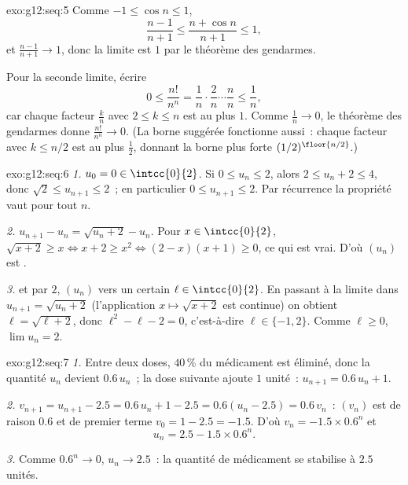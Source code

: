 \begin{solution}{exo:g12:seq:5}
Comme $-1 \leq \cos n \leq 1$,
\[
\frac{n-1}{n+1} \leq \frac{n + \cos n}{n+1} \leq 1,
\]
et $\frac{n-1}{n+1} \to 1$, donc la limite est $1$ par le théorème des
gendarmes.

Pour la seconde limite, écrire
\[
0 \leq \frac{n!}{n^n}
= \frac{1}{n}\cdot\frac{2}{n}\cdots\frac{n}{n}
\leq \frac{1}{n},
\]
car chaque facteur $\frac{k}{n}$ avec $2 \leq k \leq n$ est au plus $1$.
Comme $\frac1n \to 0$, le théorème des gendarmes donne
$\frac{n!}{n^n} \to 0$. (La borne  suggérée fonctionne aussi~:
chaque facteur avec $k \leq n/2$ est au plus $\frac12$, donnant la borne
plus forte $(1/2)^{\floor{n/2}}$.)
\end{solution}

\begin{solution}{exo:g12:seq:6}
\emph{1.} $u_0 = 0 \in \intcc{0}{2}$. Si $0 \leq u_n \leq 2$, alors
$2 \leq u_n + 2 \leq 4$, donc $\sqrt{2} \leq u_{n+1} \leq 2$~; en
particulier $0 \leq u_{n+1} \leq 2$. Par récurrence la propriété vaut pour
tout $n$.

\emph{2.} $u_{n+1} - u_n = \sqrt{u_n + 2} - u_n$. Pour
$x \in \intcc{0}{2}$, $\sqrt{x+2} \geq x \iff x + 2 \geq x^2 \iff
(2-x)(x+1) \geq 0$, ce qui est vrai. D'où $(u_n)$ est .

\emph{3.}  et  par $2$, $(u_n)$  vers un certain
$\ell \in \intcc{0}{2}$. En passant à la limite dans
$u_{n+1} = \sqrt{u_n + 2}$ (l'application $x \mapsto \sqrt{x+2}$ est
continue) on obtient $\ell = \sqrt{\ell + 2}$, donc
$\ell^2 - \ell - 2 = 0$, c'est-à-dire $\ell \in \{-1, 2\}$. Comme
$\ell \geq 0$, $\lim u_n = 2$.
\end{solution}

\begin{solution}{exo:g12:seq:7}
\emph{1.} Entre deux doses, $40\,\%$ du médicament est éliminé, donc la
quantité $u_n$ devient $0.6\,u_n$~; la dose suivante ajoute $1$ unité~:
$u_{n+1} = 0.6\,u_n + 1$.

\emph{2.} $v_{n+1} = u_{n+1} - 2.5 = 0.6\,u_n + 1 - 2.5 = 0.6(u_n - 2.5)
= 0.6\,v_n$~: $(v_n)$ est  de raison $0.6$ et de premier terme
$v_0 = 1 - 2.5 = -1.5$. D'où $v_n = -1.5 \times 0.6^n$ et
\[
u_n = 2.5 - 1.5 \times 0.6^n .
\]

\emph{3.} Comme $0.6^n \to 0$, $u_n \to 2.5$~: la quantité de médicament
se stabilise à $2.5$ unités.
\end{solution}

